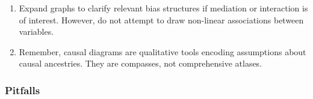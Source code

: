 \documentclass[
  singlecolumn]{article}
\begin{document}
\begin{enumerate}
\def\labelenumi{\arabic{enumi}.}
\setcounter{enumi}{10}
\item
  Expand graphs to clarify relevant bias structures if mediation or
  interaction is of interest. However, do not attempt to draw non-linear
  associations between variables.
\item
  Remember, causal diagrams are qualitative tools encoding assumptions
  about causal ancestries. They are compasses, not comprehensive
  atlases.
\end{enumerate}

\subsubsection{Pitfalls}\label{pitfalls}
\end{document}
